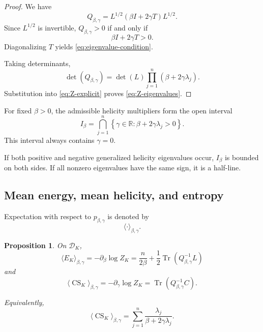 \documentclass[11pt]{article}
\newtheorem{proposition}[theorem]{Proposition}
\theoremstyle{definition}
\theoremstyle{remark}
\newcommand{\R}{\mathbb{R}}
\newcommand{\Tr}{\operatorname{Tr}}
\newcommand{\CS}{\operatorname{CS}}
\begin{document}
\begin{proof}
We have
\begin{equation}
Q_{\beta,\gamma}
=
L^{1/2}
\left(
\beta I+2\gamma T
\right)
L^{1/2}.
\end{equation}
Since \(L^{1/2}\) is invertible, \(Q_{\beta,\gamma}>0\) if
and only if
\begin{equation}
\beta I+2\gamma T>0.
\end{equation}
Diagonalizing \(T\) yields
\eqref{eq:eigenvalue-condition}.

Taking determinants,
\begin{equation}
\det(Q_{\beta,\gamma})
=
\det(L)
\prod_{j=1}^n
(\beta+2\gamma\lambda_j).
\end{equation}
Substitution into \eqref{eq:Z-explicit} proves
\eqref{eq:Z-eigenvalues}.
\end{proof}

For fixed \(\beta>0\), the admissible helicity multipliers
form the open interval
\begin{equation}
I_\beta
=
\bigcap_{j=1}^n
\left\{
\gamma\in\R:
\beta+2\gamma\lambda_j>0
\right\}.
\label{eq:I-beta}
\end{equation}
This interval always contains \(\gamma=0\).

If both positive and negative generalized helicity
eigenvalues occur, \(I_\beta\) is bounded on both sides.
If all nonzero eigenvalues have the same sign, it is a
half-line.

\subsection{Mean energy, mean helicity, and entropy}

Expectation with respect to \(p_{\beta,\gamma}\) is denoted
by
\begin{equation}
\langle\cdot\rangle_{\beta,\gamma}.
\end{equation}

\begin{proposition}
\label{prop:means}
On \(\mathscr D_K\),
\begin{equation}
\langle E_K\rangle_{\beta,\gamma}
=
-\partial_\beta\log Z_K
=
\frac{n}{2\beta}
+
\frac12
\Tr\left(
Q_{\beta,\gamma}^{-1}L
\right)
\label{eq:mean-energy}
\end{equation}
and
\begin{equation}
\langle\CS_K\rangle_{\beta,\gamma}
=
-\partial_\gamma\log Z_K
=
\Tr\left(
Q_{\beta,\gamma}^{-1}C
\right).
\label{eq:mean-CS}
\end{equation}

Equivalently,
\begin{equation}
\langle\CS_K\rangle_{\beta,\gamma}
=
\sum_{j=1}^n
\frac{\lambda_j}{
\beta+2\gamma\lambda_j
}.
\label{eq:mean-CS-eigenvalues}
\end{equation}
\end{proposition}
\end{document}

